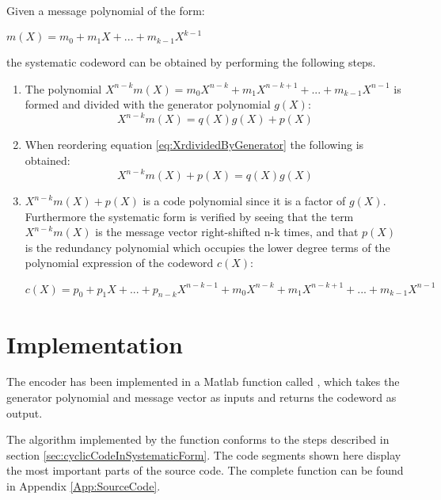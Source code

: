 \documentclass[Main]{subfiles}
\begin{document}
Given a message polynomial of the form:

{\centering 
$m(X) = m_0 + m_1X + ... + m_{k-1}X^{k-1}$ \par}

the systematic codeword can be obtained by performing the following steps.

\begin{enumerate}
\item The polynomial $X^{n-k}m(X) = m_0X^{n-k} + m_1X^{n-k+1} + ... +m_{k-1}X^{n-1}$ is formed and divided with the generator polynomial $g(X)$:
\begin{equation} \label{eq:XrdividedByGenerator}
X^{n-k}m(X) = q(X)g(X)+p(X)
\end{equation}

\item When reordering equation \ref{eq:XrdividedByGenerator} the following is obtained:
\begin{equation} \label{eq:XrdividedByGeneratorReoreded}
X^{n-k}m(X)+ p(X)=q(X)g(X)
\end{equation}

\item $X^{n-k}m(X)+p(X)$ is a code polynomial since it is a factor of $g(X)$. Furthermore the systematic form is verified by seeing that the term $X^{n-k}m(X)$ is the message vector right-shifted n-k times, and that $p(X)$ is the redundancy polynomial which occupies the lower degree terms of the polynomial expression of the codeword $c(X)$:

{\centering 
$c(X) = p_0 + p_1X + ... + p_{n-k}X^{n-k-1} + m_0X^{n-k} + m_1X^{n-k+1}+...+m_{k-1}X^{n-1}$ \par}

\end{enumerate}

\section{Implementation} \label{sec:EncImpl}
The encoder has been implemented in a Matlab function called  , which takes the generator polynomial and message vector as inputs and returns the codeword as output.

The algorithm implemented by the function conforms to the steps described in section \ref{sec:cyclicCodeInSystematicForm}. The code segments shown here display the most important parts of the source code. The complete function can be found in Appendix \ref{App:SourceCode}. 
\end{document}
